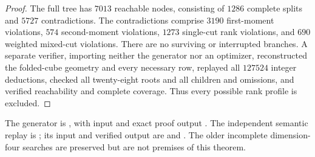 \begin{proof}
The full tree has $7013$ reachable nodes, consisting
of $1286$ complete splits and $5727$ contradictions.
The contradictions comprise $3190$ first-moment
violations, $574$ second-moment violations, $1273$
single-cut rank violations, and $690$ weighted
mixed-cut violations.  There are no surviving or
interrupted branches.  A separate verifier, importing
neither the generator nor an optimizer, reconstructed
the folded-cube geometry and every necessary row,
replayed all $127524$ integer deductions, checked
all twenty-eight roots and all children and omissions,
and verified reachability and complete coverage.
Thus every possible rank profile is excluded.
\end{proof}

The generator is
, with
input 
and exact proof output
.
The independent semantic replay is
;
its input and verified output are
and .
The older incomplete dimension-four searches are
preserved but are not premises of this theorem.


